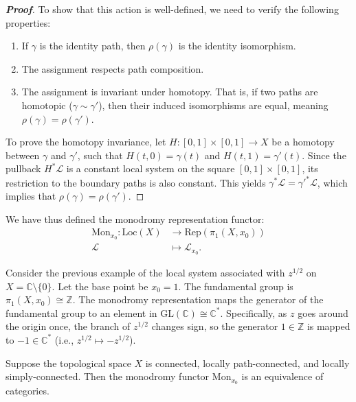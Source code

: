 \begin{proof}[\textbf{Proof}]
To show that this action is well-defined, we need to verify the following properties:
\begin{enumerate}
    \item If $\gamma$ is the identity path, then $\rho(\gamma)$ is the identity isomorphism.
    \item The assignment respects path composition.
    \item The assignment is invariant under homotopy. That is, if two paths are homotopic ($\gamma \sim \gamma'$), then their induced isomorphisms are equal, meaning $\rho(\gamma) = \rho(\gamma')$.
\end{enumerate}

To prove the homotopy invariance, let $H: [0,1] \times [0,1] \rightarrow X$ be a homotopy between $\gamma$ and $\gamma'$, such that $H(t,0) = \gamma(t)$ and $H(t,1) = \gamma'(t)$. Since the pullback $H^*\mathcal{L}$ is a constant local system on the square $[0,1] \times [0,1]$, its restriction to the boundary paths is also constant. 
This yields $\gamma^*\mathcal{L}=\gamma'^*\mathcal{L}$, which implies that $\rho(\gamma) = \rho(\gamma')$.
\end{proof}

We have thus defined the monodromy representation functor:
\begin{align*}
    \mathrm{Mon}_{x_0}: \mathrm{Loc}(X) &\longrightarrow \mathrm{Rep}(\pi_1(X, x_0)) \\
    \mathcal{L} &\longmapsto \mathcal{L}_{x_0}.
\end{align*}

\begin{example}
    Consider the previous example of the local system associated with $z^{1/2}$ on $X = \mathbb{C} \setminus \{0\}$. Let the base point be $x_0 = 1$. The fundamental group is $\pi_1(X, x_0) \cong \mathbb{Z}$. The monodromy representation maps the generator of the fundamental group to an element in $\mathrm{GL}(\mathbb{C}) \cong \mathbb{C}^*$. Specifically, as $z$ goes around the origin once, the branch of $z^{1/2}$ changes sign, so the generator $1 \in \mathbb{Z}$ is mapped to $-1 \in \mathbb{C}^*$ (i.e., $z^{1/2} \mapsto -z^{1/2}$).
\end{example}

\begin{theorem}
Suppose the topological space $X$ is connected, locally path-connected, and locally simply-connected. Then the monodromy functor $\mathrm{Mon}_{x_0}$ is an equivalence of categories.
\end{theorem}

